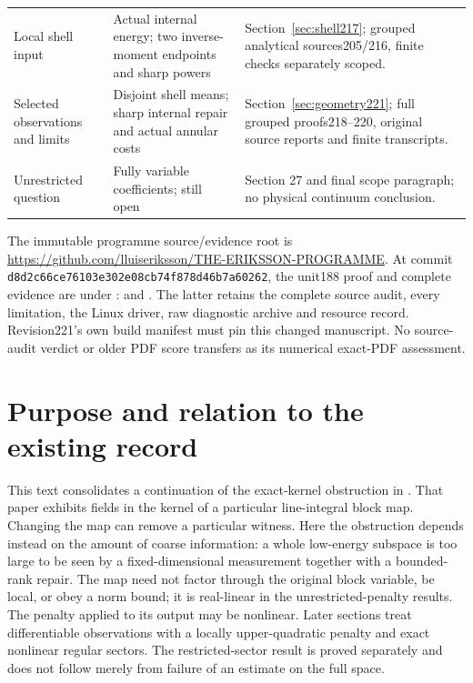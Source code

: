 \documentclass[11pt]{article}
\begin{document}
\begin{center}
\begin{tabular}{@{}p{}p{}p{}@{}}
Local shell input & Actual internal energy; two inverse-moment endpoints and sharp powers & Section~\ref{sec:shell217}; grouped analytical sources205/216, finite checks separately scoped.\\[5pt]
Selected observations and limits & Disjoint shell means; sharp internal repair and actual annular costs & Section~\ref{sec:geometry221}; full grouped proofs218--220, original source reports and finite transcripts.\\[5pt]
Unrestricted question & Fully variable coefficients; still open & Section 27 and final scope paragraph; no physical continuum conclusion.\\
\bottomrule
\end{tabular}
\end{center}
The immutable programme source/evidence root is
\url{https://github.com/lluiseriksson/THE-ERIKSSON-PROGRAMME}.
At commit \texttt{d8d2c66ce76103e302e08cb74f878d46b7a60262}, the unit188 proof and
complete evidence are under :
 and .
The latter retains the complete source audit, every limitation, the Linux driver,
raw diagnostic archive and resource record. Revision221's own build manifest must pin
this changed manuscript. No source-audit verdict or older PDF score transfers
as its numerical exact-PDF assessment.
\clearpage


\section{Purpose and relation to the existing record}
This text consolidates a continuation of the exact-kernel obstruction in
\cite{eriksson}. That paper exhibits fields in the kernel of a particular
line-integral block map. Changing the map can remove a particular witness.
Here the obstruction depends instead on the amount of coarse information:
a whole low-energy subspace is too large to be seen by a fixed-dimensional
measurement together with a bounded-rank repair. The map need not factor
through the original block variable, be local, or obey a norm bound; it is
real-linear in the unrestricted-penalty results. The penalty applied to its output may be nonlinear. Later sections treat differentiable observations with a locally upper-quadratic penalty and exact nonlinear regular sectors.
The restricted-sector result is proved separately and does not follow merely
from failure of an estimate on the full space.
\end{document}
